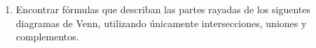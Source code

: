 \documentclass[a4paper,11pt]{article}
\begin{document}
\begin{enumerate}
        \item Encontrar f\'ormulas que describan las partes rayadas de los siguentes diagramas de Venn, utilizando \'unicamente intersecciones, uniones y complementos.\\
        
    \end{enumerate}
\end{document}
